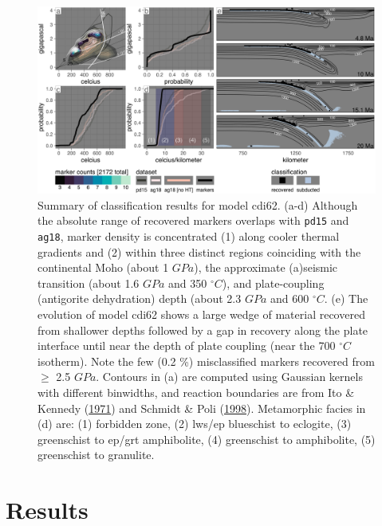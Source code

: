 \begin{landscape}


\begin{figure}[htbp]

{\centering \includegraphics[width=1\linewidth,]{assets/figs/chpt4/cdi62_bigComp} 

}

\caption[Example of marker classification for model cdi62]{Summary of classification results for model cdi62. (a-d) Although the absolute range of recovered markers overlaps with \texttt{pd15} and \texttt{ag18}, marker density is concentrated (1) along cooler thermal gradients and (2) within three distinct regions coinciding with the continental Moho (about 1 \(GPa\)), the approximate (a)seismic transition (about 1.6 \(GPa\) and 350 \(^\circ C\)), and plate-coupling (antigorite dehydration) depth (about 2.3 \(GPa\) and 600 \(^\circ C\). (e) The evolution of model cdi62 shows a large wedge of material recovered from shallower depths followed by a gap in recovery along the plate interface until near the depth of plate coupling (near the 700 \(^\circ C\) isotherm). Note the few (0.2 \%) misclassified markers recovered from \(\geq\) 2.5 \(GPa\). Contours in (a) are computed using Gaussian kernels with different binwidths, and reaction boundaries are from Ito \& Kennedy (\protect\hyperlink{ref-ito1971}{1971}) and Schmidt \& Poli (\protect\hyperlink{ref-schmidt1998}{1998}). Metamorphic facies in (d) are: (1) forbidden zone, (2) lws/ep blueschist to eclogite, (3) greenschist to ep/grt amphibolite, (4) greenschist to amphibolite, (5) greenschist to granulite.}\label{fig:bigComp}
\end{figure}


\end{landscape}

\hypertarget{chpt4Results}{%
\section{Results}\label{chpt4Results}}

